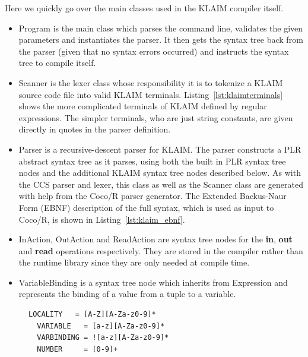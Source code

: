 	Here we quickly go over the main classes used in the KLAIM compiler itself. 	
	\begin{itemize}
	
	\item \textsf{Program} is the main class which parses the command line, 
	validates the given parameters and instantiates the parser. It then gets the 
	syntax tree back from the parser (given that no syntax errors occurred) and 
	instructs the syntax tree to compile itself.
	
	\item \textsf{Scanner} is the lexer class whose responsibility it is to 
	tokenize a KLAIM source code file into valid KLAIM terminals. 
	Listing~\ref{lst:klaimterminals} shows the more complicated terminals of 
	KLAIM defined by regular expressions. The simpler terminals, who are just 
	string constants, are given directly in quotes in the parser definition. 
	
  \item \textsf{Parser} is a recursive-descent parser for KLAIM. The parser 
  constructs a PLR abstract syntax tree as it parses, using both the built in 
  PLR syntax tree nodes and the additional KLAIM syntax tree nodes described 
  below. As with the CCS parser and lexer, this class as well as the 
  \textsf{Scanner} class are generated with help from the Coco/R \cite{cocor} 
  parser generator. The Extended Backus-Naur Form (EBNF) description of the 
  full syntax, which is used as input to Coco/R, is shown in 
  Listing~\ref{lst:klaim_ebnf}.
	
	\item \textsf{InAction, OutAction} and \textsf{ReadAction} are syntax tree 
	nodes for the \textbf{in}, \textbf{out} and \textbf{read} operations 
	respectively. They are stored in the compiler rather than the runtime 
	library since they are only needed at compile time.
	
	\item \textsf{VariableBinding} is a syntax tree node which inherits from 
	\textsf{Expression} and represents the binding of a value from a tuple to a 
	variable.
	
	\end{itemize}
	
\begin{figure}
\lstset{showtabs=false,showspaces=false,showstringspaces=false}
\begin{lstlisting}[caption=Terminals of KLAIM scanner,label=lst:klaimterminals,frame=trbl,basicstyle=\scriptsize\ttfamily,showtabs=false,showspaces=false]
  LOCALITY   = [A-Z][A-Za-z0-9]*
  VARIABLE   = [a-z][A-Za-z0-9]*
  VARBINDING = ![a-z][A-Za-z0-9]*
  NUMBER     = [0-9]+
  \end{lstlisting}
	\end{figure}
	
